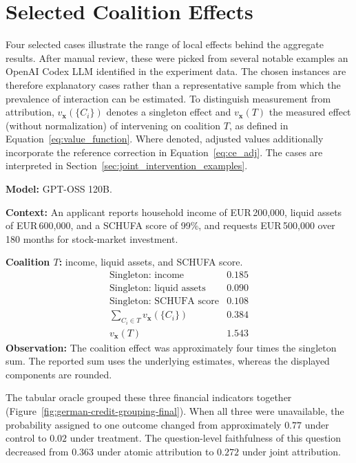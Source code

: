 \section{Selected Coalition Effects}
\label{sec:results-coalition-examples}

Four selected cases illustrate the range of local effects behind the aggregate results. After manual review, these were picked from several notable examples an OpenAI Codex LLM identified in the experiment data. The chosen instances are therefore explanatory cases rather than a representative sample from which the prevalence of interaction can be estimated. To distinguish measurement from attribution, $v_{\mathbf{x}}(\{C_i\})$ denotes a singleton effect and $v_{\mathbf{x}}(T)$ the measured effect (without normalization) of intervening on coalition $T$, as defined in Equation~\ref{eq:value_function}. Where denoted, adjusted values additionally incorporate the reference correction in Equation~\ref{eq:ce_adj}. The cases are interpreted in Section~\ref{sec:joint_intervention_examples}.

\begin{example_box}[title={Interaction case \thetcbcounter: New German Credit, question 4},label={ex:new_german_credit_threshold},fontupper=\small,arc=2mm,boxrule=0.3mm,breakable=false]
	\textbf{Model:} GPT-OSS 120B.

	\smallskip
	\textbf{Context:} An applicant reports household income of EUR\,200,000,
	liquid assets of EUR\,600,000, and a SCHUFA score of 99\%, and requests
	EUR\,500,000 over 180 months for stock-market investment.

	\smallskip
	\textbf{Coalition $T$:} income, liquid assets, and SCHUFA score.
	\[
		\begin{array}{lr}
			\text{Singleton: income}               & 0.185 \\
			\text{Singleton: liquid assets}        & 0.090 \\
			\text{Singleton: SCHUFA score}         & 0.108 \\
			\hline
			\sum_{C_i\in T}v_{\mathbf{x}}(\{C_i\}) & 0.384 \\
			v_{\mathbf{x}}(T)                      & 1.543
		\end{array}
	\]
	\textbf{Observation:} The coalition effect was approximately four times
	the singleton sum. The reported sum uses the underlying estimates,
	whereas the displayed components are rounded.
\end{example_box}

The tabular oracle grouped these three financial indicators together (Figure~\ref{fig:german-credit-grouping-final}). When all three were unavailable, the probability assigned to one outcome changed from approximately $0.77$ under control to $0.02$ under treatment. The question-level faithfulness of this question decreased from $0.363$ under atomic attribution to $0.272$ under joint attribution.

